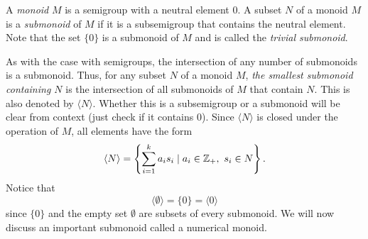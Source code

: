 A \emph{monoid} $M$ is a semigroup with a neutral element $0$. A subset $N$ of a monoid $M$ is a \emph{submonoid} of $M$ if it is a subsemigroup that contains the neutral element. Note that the set $\{0\}$ is a submonoid of $M$ and is called the \emph{trivial submonoid}.

As with the case with semigroups, the intersection of any number of submonoids is a submonoid. Thus, for any subset $N$ of a monoid $M$, \emph{the smallest submonoid containing $N$} is the intersection of all submonoids of $M$ that contain $N$. This is also denoted by $\langle N \rangle$. Whether this is a subsemigroup or a submonoid will be clear from context (just check if it contains $0$). Since $\langle N \rangle$ is closed under the operation of $M$, all elements have the form
\[
	\langle N \rangle = \left \{\sum_{i = 1}^{k} a_i s_i \mid a_i \in \mathbb{Z}_+, \ s_i \in N \right \}.
\]
Notice that
\[
	\langle \emptyset \rangle = \{0\} = \langle 0 \rangle
\]
since $\{0\}$ and the empty set $\emptyset$ are subsets of every submonoid. We will now discuss an important submonoid called a numerical monoid.